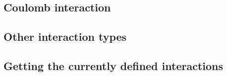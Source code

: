 \subsection{Coulomb interaction}
\label{sec:inter_electrostatics}

\subsection{Other interaction types}
\label{sec:inter_other}

\subsection{Getting the currently defined interactions}


